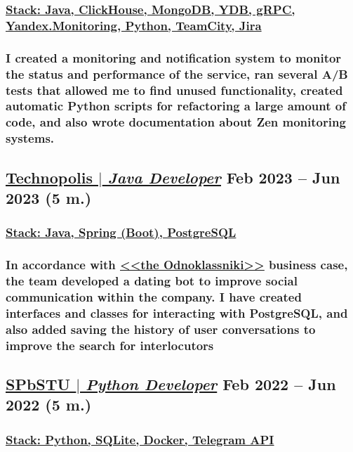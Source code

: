 \documentclass[11pt]{article}
\begin{document}
\subsubsection{\underline{\textbf{Stack}: Java, ClickHouse, MongoDB, YDB, gRPC, Yandex.Monitoring, Python, TeamCity, Jira}}
\subsubsection{I created \textbf{a monitoring and notification system} to monitor the status and
performance of the service, ran \textbf{several A/B tests} that allowed me to find
unused functionality, created \textbf{automatic Python scripts} for
refactoring a large amount of code, and also \textbf{wrote documentation} about Zen monitoring systems.}
\begin{itemize}
\end{itemize}

\subsection{\href{https://github.com/Sanerins/tamtam-one-coffee-bot}{\underline{Technopolis $|$ {\normalfont\textit{Java Developer}}}} \hfill Feb 2023 -- Jun 2023 (5 m.)}
\subsubsection{\underline{\textbf{Stack}: Java, Spring (Boot), PostgreSQL}}
\subsubsection{In accordance with \href{https://ok.ru/}{\underline{<<the Odnoklassniki>>}} business case, the team developed a dating bot to improve social communication within the company. I have \textbf{created interfaces and classes for interacting with PostgreSQL}, and also \textbf{added saving the history of user conversations} to improve the search for interlocutors}
\begin{itemize}
\end{itemize}

\subsection{\href{https://github.com/PaaavelZ/FPA-pybot}{\underline{SPbSTU $|$ {\normalfont\textit{Python Developer}}}} \hfill Feb 2022 -- Jun 2022 (5 m.)}
\subsubsection{\underline{\textbf{Stack}: Python, SQLite, Docker, Telegram API}}
\end{document}
